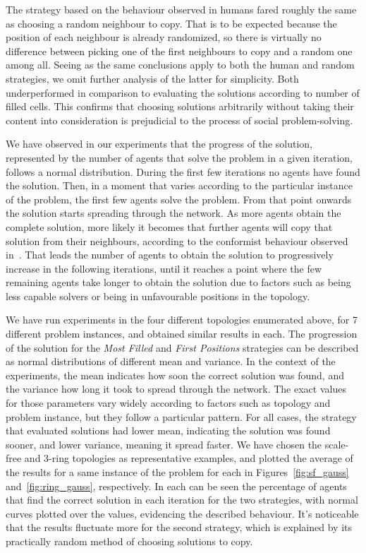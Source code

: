 \documentclass{article}
\begin{document}
The strategy based on the behaviour observed in humans fared roughly the same as choosing a random neighbour to copy. That is to be expected because the position of each neighbour is already randomized, so there is virtually no difference between picking one of the first neighbours to copy and a random one among all. Seeing as the same conclusions apply to both the human and random strategies, we omit further analysis of the latter for simplicity. Both underperformed in comparison to evaluating the solutions according to number of filled cells. This confirms that choosing solutions arbitrarily without taking their content into consideration is prejudicial to the process of social problem-solving. 

We have observed in our experiments that the progress of the solution, represented by the number of agents that solve the problem in a given iteration, follows a normal distribution. During the first few iterations no agents have found the solution. Then, in a moment that varies according to the particular instance of the problem, the first few agents solve the problem. From that point onwards the solution starts spreading through the network. As more agents obtain the complete solution, more likely it becomes that further agents will copy that solution from their neighbours, according to the conformist behaviour observed in~\cite{farenzena:collabem}. That leads the number of agents to obtain the solution to progressively increase in the following iterations, until it reaches a point where the few remaining agents take longer to obtain the solution due to factors such as being less capable solvers or being in unfavourable positions in the topology.

We have run experiments in the four different topologies enumerated above, for 7 different problem instances, and obtained similar results in each. The progression of the solution for the \emph{Most Filled} and \emph{First Positions} strategies can be described as normal distributions of different mean and variance. In the context of the experiments, the mean indicates how soon the correct solution was found, and the variance how long it took to spread through the network. The exact values for those parameters vary widely according to factors such as topology and problem instance, but they follow a particular pattern. For all cases, the strategy that evaluated solutions had lower mean, indicating the solution was found sooner, and lower variance, meaning it spread faster. We have chosen the scale-free and 3-ring topologies as representative examples, and plotted the average of the results for a same instance of the problem for each in Figures~\ref{fig:sf_gauss} and~\ref{fig:ring_gauss}, respectively. In each can be seen the percentage of agents that find the correct solution in each iteration for the two strategies, with normal curves plotted over the values, evidencing the described behaviour. It's noticeable that the results fluctuate more for the second strategy, which is explained by its practically random method of choosing solutions to copy.
\end{document}
